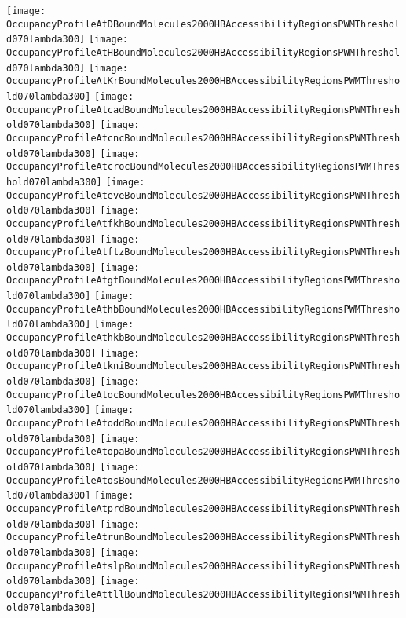 \documentclass[11pt]{article}
\begin{document}
 


\begin{center}
\texttt{[image: OccupancyProfileAtDBoundMolecules2000HBAccessibilityRegionsPWMThreshold070lambda300]}
\texttt{[image: OccupancyProfileAtHBoundMolecules2000HBAccessibilityRegionsPWMThreshold070lambda300]}
\texttt{[image: OccupancyProfileAtKrBoundMolecules2000HBAccessibilityRegionsPWMThreshold070lambda300]}
\texttt{[image: OccupancyProfileAtcadBoundMolecules2000HBAccessibilityRegionsPWMThreshold070lambda300]}
\texttt{[image: OccupancyProfileAtcncBoundMolecules2000HBAccessibilityRegionsPWMThreshold070lambda300]}
\texttt{[image: OccupancyProfileAtcrocBoundMolecules2000HBAccessibilityRegionsPWMThreshold070lambda300]}
\texttt{[image: OccupancyProfileAteveBoundMolecules2000HBAccessibilityRegionsPWMThreshold070lambda300]}
\texttt{[image: OccupancyProfileAtfkhBoundMolecules2000HBAccessibilityRegionsPWMThreshold070lambda300]}
\texttt{[image: OccupancyProfileAtftzBoundMolecules2000HBAccessibilityRegionsPWMThreshold070lambda300]}
\texttt{[image: OccupancyProfileAtgtBoundMolecules2000HBAccessibilityRegionsPWMThreshold070lambda300]}
\texttt{[image: OccupancyProfileAthbBoundMolecules2000HBAccessibilityRegionsPWMThreshold070lambda300]}
\texttt{[image: OccupancyProfileAthkbBoundMolecules2000HBAccessibilityRegionsPWMThreshold070lambda300]}
\texttt{[image: OccupancyProfileAtkniBoundMolecules2000HBAccessibilityRegionsPWMThreshold070lambda300]}
\texttt{[image: OccupancyProfileAtocBoundMolecules2000HBAccessibilityRegionsPWMThreshold070lambda300]}
\texttt{[image: OccupancyProfileAtoddBoundMolecules2000HBAccessibilityRegionsPWMThreshold070lambda300]}
\texttt{[image: OccupancyProfileAtopaBoundMolecules2000HBAccessibilityRegionsPWMThreshold070lambda300]}
\texttt{[image: OccupancyProfileAtosBoundMolecules2000HBAccessibilityRegionsPWMThreshold070lambda300]}
\texttt{[image: OccupancyProfileAtprdBoundMolecules2000HBAccessibilityRegionsPWMThreshold070lambda300]}
\texttt{[image: OccupancyProfileAtrunBoundMolecules2000HBAccessibilityRegionsPWMThreshold070lambda300]}
\texttt{[image: OccupancyProfileAtslpBoundMolecules2000HBAccessibilityRegionsPWMThreshold070lambda300]}
\texttt{[image: OccupancyProfileAttllBoundMolecules2000HBAccessibilityRegionsPWMThreshold070lambda300]}
\end{center}


\end{document}
